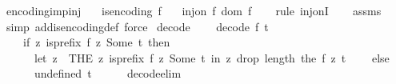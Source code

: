 \begin{isabellebody}
\isanewline
{}\isamarkupfalse%
\ encoding{\isacharunderscore}{\kern0pt}imp{\isacharunderscore}{\kern0pt}inj{\isacharcolon}{\kern0pt}\isanewline
\ \ \ {\isachardoublequoteopen}is{\isacharunderscore}{\kern0pt}encoding\ f{\isachardoublequoteclose}\isanewline
\ \ \ {\isachardoublequoteopen}inj{\isacharunderscore}{\kern0pt}on\ f\ {\isacharparenleft}{\kern0pt}dom\ f{\isacharparenright}{\kern0pt}{\isachardoublequoteclose}\isanewline
%
\isadelimproof
\ \ %
\endisadelimproof
%
\isatagproof
{}\isamarkupfalse%
\ {\isacharparenleft}{\kern0pt}rule\ inj{\isacharunderscore}{\kern0pt}onI{\isacharparenright}{\kern0pt}\isanewline
\ \ \isamarkupfalse%
\ assms\ \isamarkupfalse%
\ {\isacharparenleft}{\kern0pt}simp\ add{\isacharcolon}{\kern0pt}is{\isacharunderscore}{\kern0pt}encoding{\isacharunderscore}{\kern0pt}def{\isacharcomma}{\kern0pt}\ force{\isacharparenright}{\kern0pt}%
\endisatagproof
{\isafoldproof}%
%
\isadelimproof
\isanewline
%
\endisadelimproof
\isanewline
{}\isamarkupfalse%
\ decode\ \ \isanewline
\ \ {\isachardoublequoteopen}decode\ f\ t\ {\isacharequal}{\kern0pt}\ {\isacharparenleft}{\kern0pt}\isanewline
\ \ \ \ if\ {\isacharparenleft}{\kern0pt}{\isasymexists}{\isacharbang}{\kern0pt}z{\isachardot}{\kern0pt}\ is{\isacharunderscore}{\kern0pt}prefix\ {\isacharparenleft}{\kern0pt}f\ z{\isacharparenright}{\kern0pt}\ {\isacharparenleft}{\kern0pt}Some\ t{\isacharparenright}{\kern0pt}{\isacharparenright}{\kern0pt}\ then\ \isanewline
\ \ \ \ \ \ {\isacharparenleft}{\kern0pt}let\ z\ {\isacharequal}{\kern0pt}\ {\isacharparenleft}{\kern0pt}THE\ z{\isachardot}{\kern0pt}\ is{\isacharunderscore}{\kern0pt}prefix\ {\isacharparenleft}{\kern0pt}f\ z{\isacharparenright}{\kern0pt}\ {\isacharparenleft}{\kern0pt}Some\ t{\isacharparenright}{\kern0pt}{\isacharparenright}{\kern0pt}\ in\ {\isacharparenleft}{\kern0pt}z{\isacharcomma}{\kern0pt}\ drop\ {\isacharparenleft}{\kern0pt}length\ {\isacharparenleft}{\kern0pt}the\ {\isacharparenleft}{\kern0pt}f\ z{\isacharparenright}{\kern0pt}{\isacharparenright}{\kern0pt}{\isacharparenright}{\kern0pt}\ t{\isacharparenright}{\kern0pt}{\isacharparenright}{\kern0pt}\isanewline
\ \ \ \ else\ \isanewline
\ \ \ \ \ \ {\isacharparenleft}{\kern0pt}undefined{\isacharcomma}{\kern0pt}\ t{\isacharparenright}{\kern0pt}\isanewline
\ \ \ \ {\isacharparenright}{\kern0pt}{\isachardoublequoteclose}\isanewline
\isanewline
{}\isamarkupfalse%
\ decode{\isacharunderscore}{\kern0pt}elim{\isacharcolon}{\kern0pt}\isanewline

\end{isabellebody}
